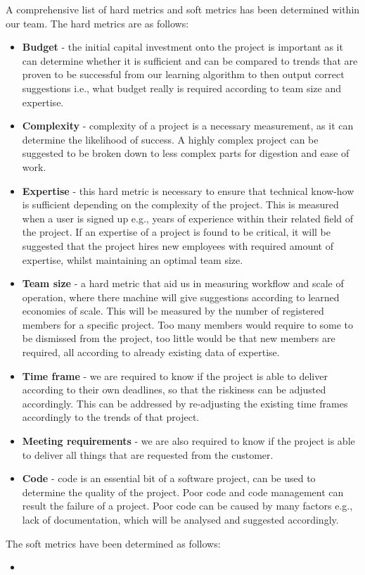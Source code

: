 \documentclass[a4paper]{article}
\theoremstyle{plain}
\theoremstyle{definition}
\theoremstyle{remark}
\begin{document}
\noindent A comprehensive list of hard metrics and soft metrics has been determined within our team. The hard metrics are as follows:
\begin{itemize}
	\item \textbf{Budget} - the initial capital investment onto the project is important as it can determine whether it is sufficient and can be compared to trends that are proven to be successful from our learning algorithm to then output correct suggestions i.e., what budget really is required according to team size and expertise.
	\item \textbf{Complexity} - complexity of a project is a necessary measurement, as it can determine the likelihood of success. A highly complex project can be suggested to be broken down to less complex parts for digestion and ease of work.
	\item \textbf{Expertise} - this hard metric is necessary to ensure that technical know-how is sufficient depending on the complexity of the project. This is measured when a user is signed up e.g., years of experience within their related field of the project. If an expertise of a project is found to be critical, it will be suggested that the project hires new employees with required amount of expertise, whilst maintaining an optimal team size.
	\item \textbf{Team size} - a hard metric that aid us in measuring workflow and scale of operation, where there machine will give suggestions according to learned economies of scale. This will be measured by the number of registered members for a specific project. Too many members would require to some to be dismissed from the project, too little would be that new members are required, all according to already existing data of expertise.
	\item \textbf{Time frame} - we are required to know if the project is able to deliver according to their own deadlines, so that the riskiness can be adjusted accordingly. This can be addressed by re-adjusting the existing time frames accordingly to the trends of that project.
	\item \textbf{Meeting requirements} - we are also required to know if the project is able to deliver all things that are requested from the customer.                                    
	\item \textbf{Code} - code is an essential bit of a software project, can be used to determine the quality of the project. Poor code and code management can result the failure of a project. Poor code can be caused by many factors e.g., lack of documentation, which will be analysed and suggested accordingly.
\end{itemize}
The soft metrics have been determined as follows:
\begin{itemize}
	\item 
\end{itemize}
\end{document}
